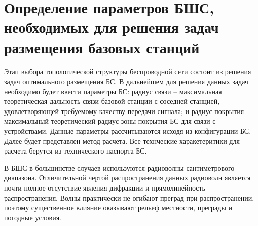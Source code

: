 





\section{Определение параметров БШС, необходимых для решения задач размещения базовых станций}

Этап выбора топологической структуры беспроводной сети состоит из решения задач оптимального размещения БС. В дальнейшем для решения данных задач необходимо будет ввести параметры БС: радиус связи -- максимальная теоретическая дальность связи базовой станции с соседней станцией, удовлетворяющей требуемому качеству передачи сигнала; и радиус покрытия -- максимальный теоретический радиус зоны покрытия БС для связи с устройствами. Данные параметры рассчитываются исходя из конфигурации БС. Далее будет представлен метод расчета. Все технческие харакетеритики для расчета берутся из технического паспорта БС.




В БШС в большинстве случаев используются радиоволны сантиметрового диапазона. Отличительной чертой распространения данных радиоволн  является почти полное отсутствие явления дифракции и прямолинейность распространения. Волны практически не огибают преград при распространении, поэтому существенное влияние оказывают рельеф местности, преграды и погодные условия. 

